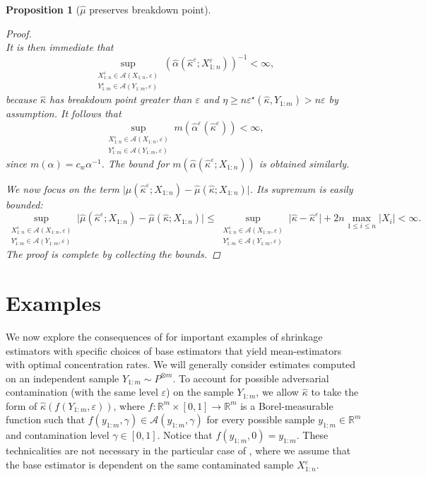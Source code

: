 \documentclass{article}
\theoremstyle{plain}
\newtheorem{proposition}[theorem]{Proposition}
\theoremstyle{definition}
\def\R{\mathbb{R}} %
\def\sA{\mathcal{A}}
\begin{document}
\begin{proposition}[\( \widehat{\mu }  \) preserves breakdown point]
\begin{proof}
\[    \]
    It is then immediate that
    \[
      \sup_{\substack{X_{1:n}^\varepsilon \in \sA(X_{1:n},\varepsilon )\\Y_{1:m}^\varepsilon \in \sA(Y_{1:m},\varepsilon )}} (\widehat{\alpha }(\widehat{\kappa }^\varepsilon ; X_{1:n}^\varepsilon  ) )^{-1} < \infty,
    \]
    because \( \widehat{\kappa}\) has breakdown point greater than \( \varepsilon  \) and \( \eta \ge n \varepsilon ^\star(\widehat{\kappa }, Y_{1:m} )>n \varepsilon  \) by assumption.   
    It follows that
    \[
      \sup_{\substack{X_{1:n}^\varepsilon \in \sA(X_{1:n},\varepsilon )\\Y_{1:m}^\varepsilon \in \sA(Y_{1:m},\varepsilon )}} m(\widehat{\alpha }^\varepsilon (\widehat{\kappa }^\varepsilon  )) <\infty,
    \]
    since \( m(\alpha ) = c_w\alpha ^{-1} \). The bound for \( m(\widehat{\alpha }(\widehat{\kappa }^\varepsilon ; X_{1:n} ) ) \) is obtained similarly. 

    We now focus on the term \( \lvert \widehat{\mu }(\widehat{\kappa }^\varepsilon; X_{1:n}  ) - \widehat{\mu }(\widehat{\kappa } ; X_{1:n} )   \rvert  \). Its supremum is easily bounded: 
    \[
      \sup_{\substack{X_{1:n}^\varepsilon \in \sA(X_{1:n},\varepsilon )\\Y_{1:m}^\varepsilon \in \sA(Y_{1:m},\varepsilon )}}\lvert \widehat{\mu }(\widehat{\kappa }^\varepsilon; X_{1:n}  ) - \widehat{\mu }(\widehat{\kappa } ; X_{1:n} )   \rvert \le \sup_{\substack{X_{1:n}^\varepsilon \in \sA(X_{1:n},\varepsilon )\\Y_{1:m}^\varepsilon \in \sA(Y_{1:m},\varepsilon )}} \lvert \widehat{\kappa } - \widehat{\kappa }^\varepsilon    \rvert + 2n \max_{1 \le i \le n} \lvert X_i \rvert  < \infty.
    \] 
    The proof is complete by collecting the bounds. \qedhere
    \end{proof}
  \end{proposition}
\section{Examples}
We now explore the consequences of  for important examples of shrinkage estimators with specific choices of base estimators that yield mean-estimators with optimal concentration rates. We will generally consider estimates computed on an independent sample \( Y_{1:m} \sim P^{\otimes m } \). To account for possible adversarial contamination (with the same level \( \varepsilon  \)) on the sample \( Y_{1:m} \), we allow \( \widehat{\kappa } \) to take the form of \( \widehat{\kappa }(f(Y_{1:m}, \varepsilon ))  \), where \( f\colon \R^m \times [0,1]\to  \R^m \) is a Borel-measurable function such that \( f(y_{1:m}, \gamma ) \in \sA(y_{1:m}, \gamma ) \) for every possible sample \( y_{1:m} \in \R^m \) and contamination level \( \gamma \in [0,1] \). Notice that \( f(y_{1:m}, 0) = y_{1:m} \). These technicalities are not necessary in the particular case of , where we assume that the base estimator is dependent on the same contaminated sample \( X^\varepsilon _{1:n} \).
\end{document}
